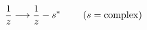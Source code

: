 \begin{equation}
\frac{1}{z} \longrightarrow \frac{1}{z} - s^{\ast}~~~~~~~(s= {\rm complex})
\end{equation}

